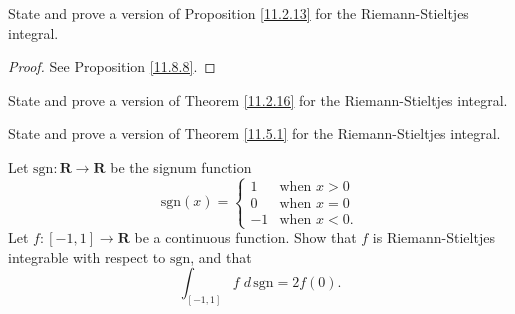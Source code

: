 \begin{exercise}\label{ex 11.8.2}
    State and prove a version of Proposition \ref{11.2.13} for the Riemann-Stieltjes integral.
\end{exercise}

\begin{proof}
    See Proposition \ref{11.8.8}.
\end{proof}

\begin{exercise}\label{ex 11.8.3}
    State and prove a version of Theorem \ref{11.2.16} for the Riemann-Stieltjes integral.
\end{exercise}

\begin{exercise}\label{ex 11.8.4}
    State and prove a version of Theorem \ref{11.5.1} for the Riemann-Stieltjes integral.
\end{exercise}

\begin{exercise}\label{ex 11.8.5}
    Let \(\text{sgn} : \mathbf{R} \to \mathbf{R}\) be the signum function
    \[
        \text{sgn}(x) = \begin{cases}
            1  & \text{when } x > 0  \\
            0  & \text{when } x = 0  \\
            -1 & \text{when } x < 0.
        \end{cases}
    \]
    Let \(f : [-1, 1] \to \mathbf{R}\) be a continuous function.
    Show that \(f\) is Riemann-Stieltjes integrable with respect to \(\text{sgn}\), and that
    \[
        \int_{[-1, 1]} f \; d \, \text{sgn} = 2f(0).
    \]
\end{exercise}